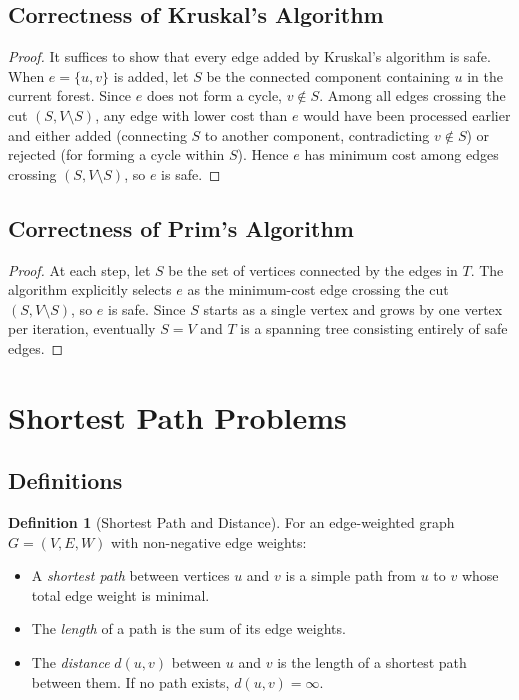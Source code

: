 \documentclass[11pt, a4paper, notitlepage]{report}
\theoremstyle{definition}
\newtheorem{definition}[theorem]{Definition}
\theoremstyle{remark}
\begin{document}
\subsection{Correctness of Kruskal's Algorithm}
\label{subsec:kruskal-correct}

\begin{proof}
It suffices to show that every edge added by Kruskal's algorithm is safe. When $e = \{u,v\}$ is added, let $S$ be the connected component containing $u$ in the current forest. Since $e$ does not form a cycle, $v \notin S$. Among all edges crossing the cut $(S, V \setminus S)$, any edge with lower cost than $e$ would have been processed earlier and either added (connecting $S$ to another component, contradicting $v \notin S$) or rejected (for forming a cycle within $S$). Hence $e$ has minimum cost among edges crossing $(S, V \setminus S)$, so $e$ is safe.
\end{proof}

\subsection{Correctness of Prim's Algorithm}
\label{subsec:prim-correct}

\begin{proof}
At each step, let $S$ be the set of vertices connected by the edges in $T$. The algorithm explicitly selects $e$ as the minimum-cost edge crossing the cut $(S, V \setminus S)$, so $e$ is safe. Since $S$ starts as a single vertex and grows by one vertex per iteration, eventually $S = V$ and $T$ is a spanning tree consisting entirely of safe edges.
\end{proof}

\section{Shortest Path Problems}
\label{sec:shortest-paths}

\subsection{Definitions}
\label{subsec:sp-defs}

\begin{definition}[Shortest Path and Distance]
\label{def:shortest-path}
For an edge-weighted graph $G = (V, E, W)$ with non-negative edge weights:
\begin{itemize}
  \item A \emph{shortest path} between vertices $u$ and $v$ is a simple path from $u$ to $v$ whose total edge weight is minimal.
  \item The \emph{length} of a path is the sum of its edge weights.
  \item The \emph{distance} $d(u,v)$ between $u$ and $v$ is the length of a shortest path between them. If no path exists, $d(u,v) = \infty$.
\end{itemize}
\end{definition}
\end{document}
